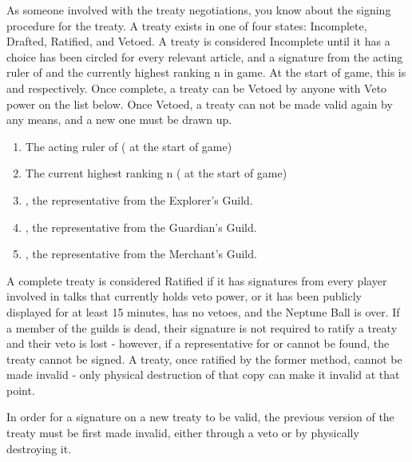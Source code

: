 \documentclass[green]{NeptuneBall}
\begin{document}
\name{\gTreaty{}}

As someone involved with the treaty negotiations, you know about the signing procedure for the treaty. A treaty exists in one of four states: Incomplete, Drafted, Ratified, and Vetoed. A treaty is considered Incomplete until it has a choice has been circled for every relevant article, and a signature from the acting ruler of \pAtlantis{} and the currently highest ranking \pPacifica{}n in game. At the start of game, this is \cKing{\King} \cKing{} and \cPrince{\Prince} \cPrince{} respectively. Once complete, a treaty can be Vetoed by anyone with Veto power on the list below. Once Vetoed, a treaty can not be made valid again by any means, and a new one must be drawn up. 

\begin{enumerate}
\item The acting ruler of \pAtlantis{} (\cKing{\King} \cKing{} at the start of game)
\item The current highest ranking \pPacifica{}n (\cPrince{\Prince} \cPrince{} at the start of game)
\item \cPriest{}, the representative from the Explorer's Guild.
\item \cGeneral{}, the representative from the Guardian's Guild.
\item \cSlave{}, the representative from the Merchant's Guild.
\end{enumerate}

A complete treaty is considered Ratified if it has signatures from every player involved in talks that currently holds veto power, or it has been publicly displayed for at least 15 minutes, has no vetoes, and the Neptune Ball is over. If a member of the guilds is dead, their signature is not required to ratify a treaty and their veto is lost - however, if a representative for \pAtlantis{} or \pPacifica{} cannot be found, the treaty cannot be signed. A treaty, once ratified by the former method, cannot be made invalid - only physical destruction of that copy can make it invalid at that point.

In order for a signature on a new treaty to be valid, the previous version of the treaty must be first made invalid, either through a veto or by physically destroying it.
\end{document}
